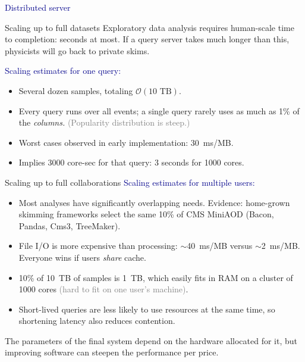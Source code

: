 \documentclass{beamer}
\begin{document}

\begin{frame}{}
\begin{center}
\LARGE \textcolor{darkblue}{Distributed server}
\end{center}
\end{frame}

\begin{frame}{Scaling up to full datasets}
Exploratory data analysis requires human-scale time to completion: seconds at most. If a query server takes much longer than this, physicists will go back to private skims.

\vfill
\textcolor{darkblue}{Scaling estimates for one query:}
\begin{itemize}
\item Several dozen samples, totaling $\mathcal{O}(\mbox{10~TB})$.
\item Every query runs over all events; a single query rarely uses as much as 1\% of the {\it columns.} \textcolor{gray}{(Popularity distribution is steep.)}
\item Worst cases observed in early implementation: 30~ms/MB.
\item Implies 3000 core-sec for that query: 3 seconds for 1000 cores.
\end{itemize}
\end{frame}

\begin{frame}{Scaling up to full collaborations}
\vspace{0.4 cm}
\textcolor{darkblue}{Scaling estimates for multiple users:}
\begin{itemize}
\item Most analyses have significantly overlapping needs. Evidence: home-grown skimming frameworks select the same 10\% of CMS MiniAOD (Bacon, Pandas, Cms3, TreeMaker).
\item File I/O is more expensive than processing: $\sim$40~ms/MB versus $\sim$2~ms/MB. Everyone wins if users {\it share} cache.
\item 10\% of 10~TB of samples is 1~TB, which easily fits in RAM on a cluster of 1000 cores \textcolor{gray}{(hard to fit on one user's machine)}.
\item Short-lived queries are less likely to use resources at the same time, so shortening latency also reduces contention.
\end{itemize}

\vfill
The parameters of the final system depend on the hardware allocated for it, but improving software can steepen the performance per price.
\end{frame}
\end{document}
